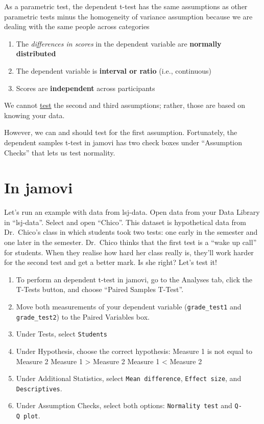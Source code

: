 \documentclass[
]{book}
\begin{document}
As a parametric test, the dependent t-test has the same assumptions as other parametric tests minus the homogeneity of variance assumption because we are dealing with the same people across categories

\begin{enumerate}
\def\labelenumi{\arabic{enumi}.}
\item
  The \emph{differences in scores} in the dependent variable are \textbf{normally distributed}
\item
  The dependent variable is \textbf{interval or ratio} (i.e., continuous)
\item
  Scores are \textbf{independent} across participants
\end{enumerate}

We cannot \underline{test} the second and third assumptions; rather, those are based on knowing your data.

However, we can and should test for the first assumption. Fortunately, the dependent samples t-test in jamovi has two check boxes under ``Assumption Checks'' that lets us test normality.

\hypertarget{in-jamovi}{%
\section{In jamovi}\label{in-jamovi}}

Let's run an example with data from lsj-data. Open data from your Data Library in ``lsj-data''. Select and open ``Chico''. This dataset is hypothetical data from Dr.~Chico's class in which students took two tests: one early in the semester and one later in the semester. Dr.~Chico thinks that the first test is a ``wake up call'' for students. When they realise how hard her class really is, they'll work harder for the second test and get a better mark. Is she right? Let's test it!

\begin{enumerate}
\def\labelenumi{\arabic{enumi}.}
\item
  To perform an dependent t-test in jamovi, go to the Analyses tab, click the T-Tests button, and choose ``Paired Samples T-Test''.
\item
  Move both measurements of your dependent variable (\texttt{grade\_test1} and \texttt{grade\_test2}) to the Paired Variables box.
\item
  Under Tests, select \texttt{Student\textquotesingle{}s}
\item
  Under Hypothesis, choose the correct hypothesis: Measure 1 is not equal to Measure 2 Measure 1 \textgreater{} Measure 2 Measure 1 \textless{} Measure 2
\item
  Under Additional Statistics, select \texttt{Mean\ difference}, \texttt{Effect\ size}, and \texttt{Descriptives}.
\item
  Under Assumption Checks, select both options: \texttt{Normality\ test} and \texttt{Q-Q\ plot}.
\end{enumerate}
\end{document}
